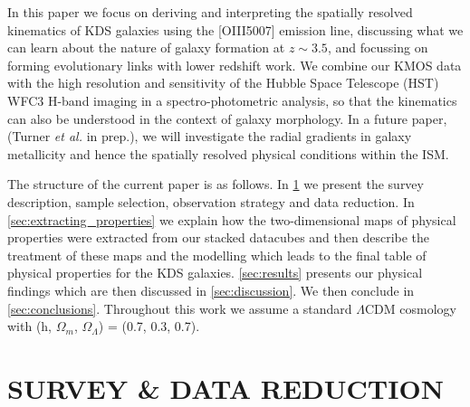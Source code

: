 \documentclass[a4paper,fleqn,usenatbib]{mn2e}
\begin{document}
In this paper we focus on deriving and interpreting the spatially resolved kinematics of KDS galaxies using the [OIII5007] emission line, discussing what we can learn about the nature of galaxy formation at $z \sim 3.5$, and focussing on forming evolutionary links with lower redshift work.
We combine our KMOS data with the high resolution and sensitivity of the Hubble Space Telescope (HST) WFC3 H-band imaging in a spectro-photometric analysis, so that the kinematics can also be understood in the context of galaxy morphology.
In a future paper, (Turner \textit{et al.} in prep.), we will investigate the radial gradients in galaxy metallicity and hence the spatially resolved physical conditions within the ISM.

The structure of the current paper is as follows. In \cref{sec:Survey_and_data} we present the survey description, sample selection, observation strategy and data reduction.
In \cref{sec:extracting_properties} we explain how the two-dimensional maps of physical properties were extracted from our stacked datacubes and then describe the treatment of these maps and the modelling which leads to the final table of physical properties for the KDS galaxies. 
\cref{sec:results} presents our physical findings which are then discussed in \cref{sec:discussion}.
We then conclude in \cref{sec:conclusions}.
Throughout this work we assume a standard $\Lambda$CDM cosmology with (h, $\Omega_{m}$, $\Omega_{\Lambda}$) = (0.7, 0.3, 0.7). 

\section{SURVEY \& DATA REDUCTION}\label{sec:Survey_and_data}


\end{document}
